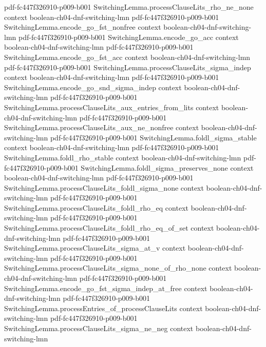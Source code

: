 \begin{theorem}
  {pdf-fc447f326910-p009-b001}
\proofstep
  {SwitchingLemma.processClauseLits_rho_ne_none}
  {context}
  {boolean-ch04-dnf-switching-lmn}
  {pdf-fc447f326910-p009-b001}
\proofstep
  {SwitchingLemma.encode_go_fst_nonfree}
  {context}
  {boolean-ch04-dnf-switching-lmn}
  {pdf-fc447f326910-p009-b001}
\proofstep
  {SwitchingLemma.encode_go_acc}
  {context}
  {boolean-ch04-dnf-switching-lmn}
  {pdf-fc447f326910-p009-b001}
\proofstep
  {SwitchingLemma.encode_go_fst_acc}
  {context}
  {boolean-ch04-dnf-switching-lmn}
  {pdf-fc447f326910-p009-b001}
\proofstep
  {SwitchingLemma.processClauseLits_sigma_indep}
  {context}
  {boolean-ch04-dnf-switching-lmn}
  {pdf-fc447f326910-p009-b001}
\proofstep
  {SwitchingLemma.encode_go_snd_sigma_indep}
  {context}
  {boolean-ch04-dnf-switching-lmn}
  {pdf-fc447f326910-p009-b001}
\proofstep
  {SwitchingLemma.processClauseLits_aux_entries_from_lits}
  {context}
  {boolean-ch04-dnf-switching-lmn}
  {pdf-fc447f326910-p009-b001}
\proofstep
  {SwitchingLemma.processClauseLits_aux_ne_nonfree}
  {context}
  {boolean-ch04-dnf-switching-lmn}
  {pdf-fc447f326910-p009-b001}
\proofstep
  {SwitchingLemma.foldl_sigma_stable}
  {context}
  {boolean-ch04-dnf-switching-lmn}
  {pdf-fc447f326910-p009-b001}
\proofstep
  {SwitchingLemma.foldl_rho_stable}
  {context}
  {boolean-ch04-dnf-switching-lmn}
  {pdf-fc447f326910-p009-b001}
\proofstep
  {SwitchingLemma.foldl_sigma_preserves_none}
  {context}
  {boolean-ch04-dnf-switching-lmn}
  {pdf-fc447f326910-p009-b001}
\proofstep
  {SwitchingLemma.processClauseLits_foldl_sigma_none}
  {context}
  {boolean-ch04-dnf-switching-lmn}
  {pdf-fc447f326910-p009-b001}
\proofstep
  {SwitchingLemma.processClauseLits_foldl_rho_eq}
  {context}
  {boolean-ch04-dnf-switching-lmn}
  {pdf-fc447f326910-p009-b001}
\proofstep
  {SwitchingLemma.processClauseLits_foldl_rho_eq_of_set}
  {context}
  {boolean-ch04-dnf-switching-lmn}
  {pdf-fc447f326910-p009-b001}
\proofstep
  {SwitchingLemma.processClauseLits_sigma_at_v}
  {context}
  {boolean-ch04-dnf-switching-lmn}
  {pdf-fc447f326910-p009-b001}
\proofstep
  {SwitchingLemma.processClauseLits_sigma_none_of_rho_none}
  {context}
  {boolean-ch04-dnf-switching-lmn}
  {pdf-fc447f326910-p009-b001}
\proofstep
  {SwitchingLemma.encode_go_fst_sigma_indep_at_free}
  {context}
  {boolean-ch04-dnf-switching-lmn}
  {pdf-fc447f326910-p009-b001}
\proofstep
  {SwitchingLemma.processEntries_of_processClauseLits}
  {context}
  {boolean-ch04-dnf-switching-lmn}
  {pdf-fc447f326910-p009-b001}
\proofstep
  {SwitchingLemma.processClauseLits_sigma_ne_neg}
  {context}
  {boolean-ch04-dnf-switching-lmn}

\end{theorem}
